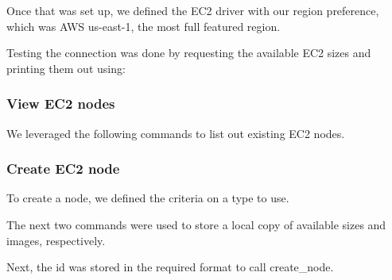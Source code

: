 

Once that was set up, we defined the EC2 driver with our region preference, which was 
AWS us-east-1, the most full featured region.


Testing the connection was done by requesting the available EC2 sizes and
printing them out using:


\subsubsection{View EC2 nodes}\label{view-ec2-nodes}

We leveraged the following commands to list out existing EC2 nodes.




\subsubsection{Create EC2 node}\label{create-ec2-node}

To create a node, we defined the criteria on a type to use.



The next two commands were used to store a local copy of available sizes and
images, respectively. 



Next, the id was stored in the required format to call create\_node.



